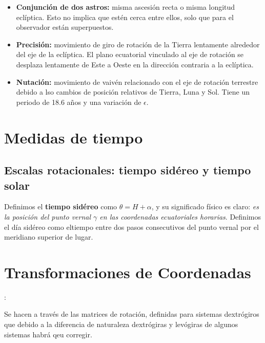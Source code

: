 \begin{itemize}
	\item \textbf{Conjunción de dos astros:} misma ascesión recta o misma longitud eclíptica. Esto no implica que estén cerca entre ellos, solo que  para el observador están superpuestos.
	\item \textbf{Precisión:} movimiento de giro de rotación de la Tierra lentamente alrededor del eje de la eclíptica. El plano ecuatorial vinculado al eje de rotación se desplaza lentamente de Este a Oeste en la dirección contraria a la eclíptica. 
	\item \textbf{Nutación:} movimiento de vaivén relacionado con el eje de rotación terrestre debido a lso cambios de posición relativos de Tierra, Luna y Sol. Tiene un periodo de 18.6 años y una variación de $\epsilon$. 
\end{itemize}

\section{Medidas de tiempo}

\subsection{Escalas rotacionales: tiempo sidéreo y tiempo solar}

Definimos el \textbf{tiempo sidéreo} como $\theta=H+\alpha$, y su significado físico es claro: \textit{es la posición del punto vernal $\gamma$ en las coordenadas ecuatoriales horarias}. Definimos el día sidéreo como eltiempo entre dos pasos consecutivos del punto vernal por el meridiano superior de lugar. 

\section{Transformaciones de Coordenadas}:

Se hacen a través de las matrices de rotación, definidas para sistemas dextrógiros que debido a la diferencia de naturaleza dextrógiras y levógiras de algunos sistemas habrá qeu corregir. 




